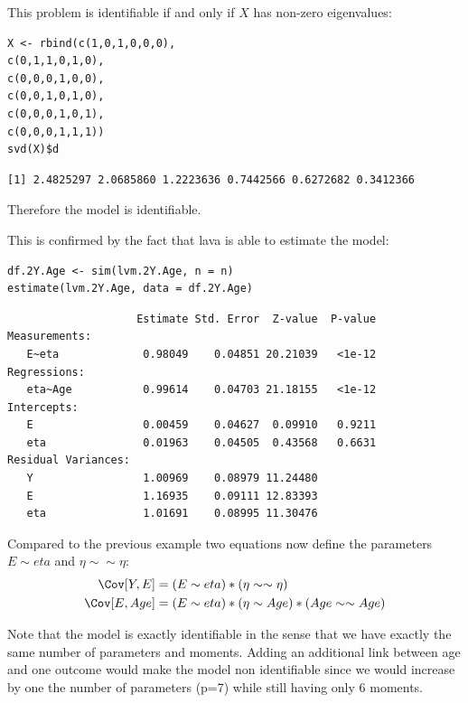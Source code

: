 \documentclass{article}
\begin{document}
This problem is identifiable if and only if \(X\) has non-zero eigenvalues:
\lstset{language=r,label= ,caption= ,captionpos=b,numbers=none}
\begin{lstlisting}
X <- rbind(c(1,0,1,0,0,0),
c(0,1,1,0,1,0),
c(0,0,0,1,0,0),
c(0,0,1,0,1,0),
c(0,0,0,1,0,1),
c(0,0,0,1,1,1))
svd(X)$d
\end{lstlisting}

\begin{verbatim}
[1] 2.4825297 2.0685860 1.2223636 0.7442566 0.6272682 0.3412366
\end{verbatim}

Therefore the model is identifiable.

This is confirmed by the fact that lava is able to estimate the model:
\lstset{language=r,label= ,caption= ,captionpos=b,numbers=none}
\begin{lstlisting}
df.2Y.Age <- sim(lvm.2Y.Age, n = n)
estimate(lvm.2Y.Age, data = df.2Y.Age)
\end{lstlisting}

\begin{verbatim}
                    Estimate Std. Error  Z-value  P-value
Measurements:                                            
   E~eta             0.98049    0.04851 20.21039   <1e-12
Regressions:                                             
   eta~Age           0.99614    0.04703 21.18155   <1e-12
Intercepts:                                              
   E                 0.00459    0.04627  0.09910   0.9211
   eta               0.01963    0.04505  0.43568   0.6631
Residual Variances:                                      
   Y                 1.00969    0.08979 11.24480         
   E                 1.16935    0.09111 12.83393         
   eta               1.01691    0.08995 11.30476
\end{verbatim}

Compared to the previous example two equations now define the parameters \(E \sim
eta\) and \(\eta \sim \sim \eta\):
\begin{align*}
\Cov[Y,E] &= (E \sim eta) * (\eta \sim \sim \eta) \\
\Cov[E,Age] &= (E \sim eta) * (\eta \sim Age) * (Age \sim \sim Age)
\end{align*}

Note that the model is exactly identifiable in the sense that we have
exactly the same number of parameters and moments. Adding an
additional link between age and one outcome would make the model non
identifiable since we would increase by one the number of parameters
(p=7) while still having only 6 moments.
\end{document}
